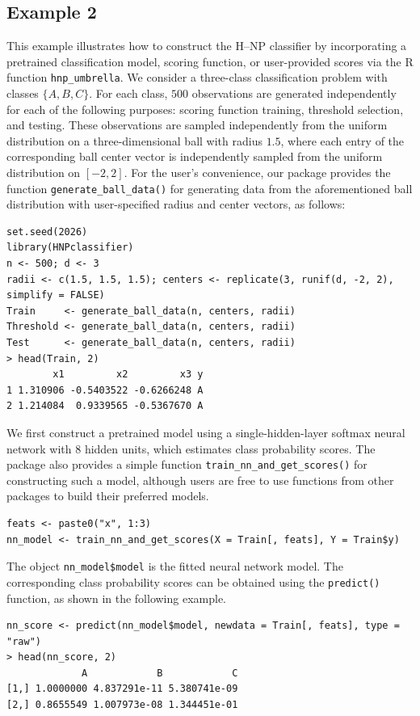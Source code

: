 \subsection{Example 2}
This example illustrates how to construct the H--NP classifier by incorporating a pretrained classification model, scoring function, or user-provided scores via the R function \texttt{hnp\_umbrella}. We consider a three-class classification problem with classes \(\{A, B, C\}\). For each class, \(500\) observations are generated independently for each of the following purposes: scoring function training, threshold selection, and testing. These observations are sampled independently from the uniform distribution on a three-dimensional ball with radius \(1.5\), where each entry of the corresponding ball center vector is independently sampled from the uniform distribution on \([-2, 2]\). For the user’s convenience, our package provides the function \texttt{generate\_ball\_data()} for generating data from the aforementioned ball distribution with user-specified radius and center vectors, as follows:
\begin{verbatim}
set.seed(2026)
library(HNPclassifier)
n <- 500; d <- 3
radii <- c(1.5, 1.5, 1.5); centers <- replicate(3, runif(d, -2, 2), simplify = FALSE)
Train     <- generate_ball_data(n, centers, radii) 
Threshold <- generate_ball_data(n, centers, radii)
Test      <- generate_ball_data(n, centers, radii)
> head(Train, 2)
        x1         x2         x3 y
1 1.310906 -0.5403522 -0.6266248 A
2 1.214084  0.9339565 -0.5367670 A
\end{verbatim}



We first construct a pretrained model using a single-hidden-layer softmax neural network with \(8\) hidden units, which estimates class probability scores. The package also provides a simple function \texttt{train\_nn\_and\_get\_scores()} for constructing such a model, although users are free to use functions from other packages to build their preferred models.
\begin{verbatim}
feats <- paste0("x", 1:3)
nn_model <- train_nn_and_get_scores(X = Train[, feats], Y = Train$y)
\end{verbatim}
The object \texttt{nn\_model\$model} is the fitted neural network model. The corresponding class probability scores can be obtained using the \texttt{predict()} function, as shown in the following example.
\begin{verbatim}
nn_score <- predict(nn_model$model, newdata = Train[, feats], type = "raw")  
> head(nn_score, 2)
             A            B            C
[1,] 1.0000000 4.837291e-11 5.380741e-09
[2,] 0.8655549 1.007973e-08 1.344451e-01
\end{verbatim}

